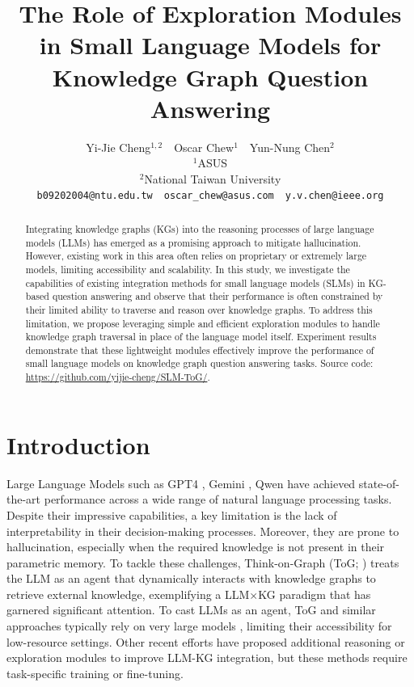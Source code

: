 \documentclass[11pt]{article}
\title{The Role of Exploration Modules in Small Language Models for Knowledge Graph Question Answering}
\author{Yi-Jie Cheng$^{1,2}\quad$Oscar Chew$^1\quad$Yun-Nung Chen$^2$ \\
  $^1$ASUS \\
  $^2$National Taiwan University \\
  \texttt{b09202004@ntu.edu.tw$\quad$oscar\_chew@asus.com$\quad$y.v.chen@ieee.org}
}
\begin{document}
\maketitle
\begin{abstract}
Integrating knowledge graphs (KGs) into the reasoning processes of large language models (LLMs) has emerged as a promising approach to mitigate hallucination. However, existing work in this area often relies on proprietary or extremely large models, limiting accessibility and scalability. In this study, we investigate the capabilities of existing integration methods for small language models (SLMs) in KG-based question answering and observe that their performance is often constrained by their limited ability to traverse and reason over knowledge graphs. To address this limitation, we propose leveraging simple and efficient exploration modules to handle knowledge graph traversal in place of the language model itself. Experiment results demonstrate that these lightweight modules effectively improve the performance of small language models on knowledge graph question answering tasks. Source code: \url{https://github.com/yijie-cheng/SLM-ToG/}.
\end{abstract}

\section{Introduction}
Large Language Models such as GPT4 \cite{openai2024gpt4}, Gemini \cite{google2023gemini}, Qwen \cite{qwen} have achieved state-of-the-art performance across a wide range of natural language processing tasks. Despite their impressive capabilities, a key limitation is the lack of interpretability in their decision-making processes. Moreover, they are prone to hallucination, especially when the required knowledge is not present in their parametric memory. To tackle these challenges, Think-on-Graph (ToG; \citealp{sun2024thinkongraph}) treats the LLM as an agent that dynamically interacts with knowledge graphs to retrieve external knowledge, exemplifying a LLM$\times$KG paradigm that has garnered significant attention. To cast LLMs as an agent,  ToG and similar approaches typically rely on very large models \cite{xu-etal-2024-generate, cheng-etal-2024-call, liang2025fast}, limiting their accessibility for low-resource settings. Other recent efforts \cite{luo2024reasoning,he2024g,ao2025lightprof,yang-etal-2025-curiousllm} have proposed additional reasoning or exploration modules to improve LLM-KG integration, but these methods require task-specific training or fine-tuning.
\end{document}
